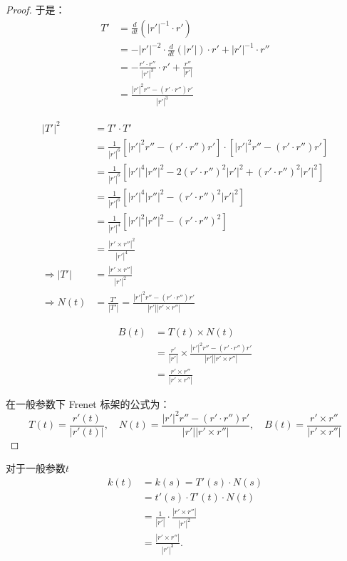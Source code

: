 \documentclass[lang=cn,10pt,thmcnt=section]{elegantbook}
\begin{document}
    \begin{proof}
    于是：
    \begin{align*}
        T' &= \frac{d}{dt} \left( |r'|^{-1} \cdot r' \right) \\
           &= -|r'|^{-2} \cdot \frac{d}{dt}(|r'|) \cdot r' + |r'|^{-1} \cdot r'' \\
           &= -\frac{r' \cdot r''}{|r'|^3} \cdot r' + \frac{r''}{|r'|} \\
           &= \frac{|r'|^2 r'' - (r' \cdot r'') r'}{|r'|^3}
        \end{align*}
        
        \begin{align*}
        |T'|^2 &= T' \cdot T' \\
              &= \frac{1}{|r'|^6} \left[ |r'|^2 r'' - (r' \cdot r'') r' \right] \cdot \left[ |r'|^2 r'' - (r' \cdot r'') r' \right] \\
              &= \frac{1}{|r'|^6} \left[ |r'|^4 |r''|^2 - 2 (r' \cdot r'')^2 |r'|^2 + (r' \cdot r'')^2 |r'|^2 \right] \\
              &= \frac{1}{|r'|^6} \left[ |r'|^4 |r''|^2 - (r' \cdot r'')^2 |r'|^2 \right] \\
              &= \frac{1}{|r'|^4} \left[ |r'|^2 |r''|^2 - (r' \cdot r'')^2 \right] \\
              &= \frac{|r' \times r''|^2}{|r'|^4}\\
              \Rightarrow |T'| &= \frac{|r' \times r''|}{|r'|^2} \\
        \Rightarrow N(t) &= \frac{T'}{|T'|} = \frac{|r'|^2 r'' - (r' \cdot r'') r'}{|r'| |r' \times r''|} 
        \end{align*}
        
        
        \begin{align*}
        B(t) &= T(t) \times N(t) \\
             &= \frac{r'}{|r'|} \times \frac{|r'|^2 r'' - (r' \cdot r'') r'}{|r'| |r' \times r''|} \\
             &= \frac{r' \times r''}{|r' \times r''|}
        \end{align*}

    在一般参数下 Frenet 标架的公式为：
\[
T(t) = \frac{r'(t)}{|r'(t)|}, \quad N(t) = \frac{|r'|^2 r'' - (r' \cdot r'') r'}{|r'| |r' \times r''|}, \quad B(t) = \frac{r' \times r''}{|r' \times r''|}
\]
\end{proof}
对于一般参数$t$
\begin{align*}
    k(t) &= k(s) = T'(s) \cdot N(s) \\
    &= t'(s) \cdot T'(t) \cdot N(t) \\
    &= \frac{1}{|r'|} \cdot \frac{|r' \times r''|}{|r'|^2} \\
    &= \frac{|r' \times r''|}{|r'|^3}.
\end{align*}
\end{document}
